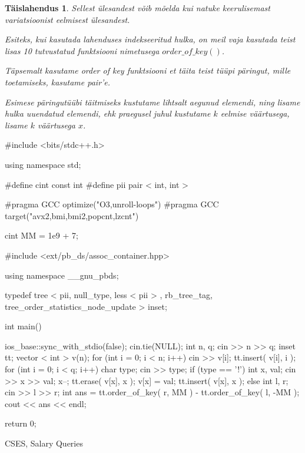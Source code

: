 \documentclass{trkut}
\newtheorem*{solution}{Täislahendus}
\begin{document}
\begin{solution}
Sellest ülesandest võib mõelda kui natuke keerulisemast variatsioonist eelmisest ülesandest.

Esiteks, kui kasutada lahenduses indekseeritud hulka, on meil vaja kasutada teist lisas 10 tutvustatud funktsiooni nimetusega $order\_of\_key()$.

Täpsemalt kasutame order of key funktsiooni et täita teist tüüpi päringut, mille toetamiseks, kasutame pair'e.

Esimese päringutüübi täitmiseks kustutame lihtsalt aegunud elemendi, ning lisame hulka uuendatud elemendi, ehk praegusel juhul kustutame $k$ eelmise väärtusega, lisame $k$ väärtusega $x$.
\end{solution}
\begin{cclol}
#include <bits/stdc++.h>

using namespace std;

#define cint
const int
#define pii pair < int, int >

#pragma GCC optimize("O3,unroll-loops")
#pragma GCC target("avx2,bmi,bmi2,popcnt,lzcnt")

cint MM = 1e9 + 7;

#include <ext/pb_ds/assoc_container.hpp>

using namespace __gnu_pbds;

typedef tree < pii, null_type, less < pii > , rb_tree_tag, 
tree_order_statistics_node_update > inset;

int main() {
  ios_base::sync_with_stdio(false);
  cin.tie(NULL);
  int n, q;
  cin >> n >> q;
  inset tt;
  vector < int > v(n);
  for (int i = 0; i < n; i++) {
    cin >> v[i];
    tt.insert({
      v[i],
      i
    });
  }
  for (int i = 0; i < q; i++) {
    char type;
    cin >> type;
    if (type == '!') {
      int x, val;
      cin >> x >> val;
      x--;
      tt.erase({
        v[x],
        x
      });
      v[x] = val;
      tt.insert({
        v[x],
        x
      });
    } else {
      int l, r;
      cin >> l >> r;
      int ans = tt.order_of_key({
        r,
        MM
      }) - tt.order_of_key({
        l,
        -MM
      });
      cout << ans << endl;
    }
  }

  return 0;
}
    \end{cclol}
    \begin{kk}[H]
    \caption{CSES, Salary Queries}%
    \end{kk}
\end{document}
